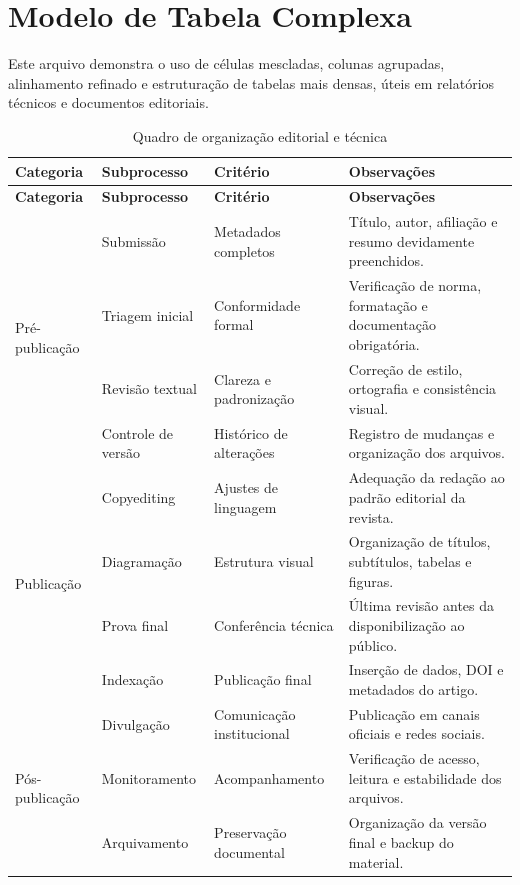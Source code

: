 \documentclass[11pt,a4paper]{article}
\begin{document}
\section*{Modelo de Tabela Complexa}

Este arquivo demonstra o uso de células mescladas, colunas agrupadas, alinhamento refinado e estruturação de tabelas mais densas, úteis em relatórios técnicos e documentos editoriais.

\begin{landscape}
\small
\begin{longtable}{p{3.0cm} p{3.8cm} p{3.4cm} p{4.6cm}}
\caption{Quadro de organização editorial e técnica} \label{tab:quadro}\\
\toprule
\textbf{Categoria} & \textbf{Subprocesso} & \textbf{Critério} & \textbf{Observações} \\
\midrule
\endfirsthead

\toprule
\textbf{Categoria} & \textbf{Subprocesso} & \textbf{Critério} & \textbf{Observações} \\
\midrule
\endhead

\multirow{4}{*}{Pré-publicação}
& Submissão & Metadados completos & Título, autor, afiliação e resumo devidamente preenchidos. \\
& Triagem inicial & Conformidade formal & Verificação de norma, formatação e documentação obrigatória. \\
& Revisão textual & Clareza e padronização & Correção de estilo, ortografia e consistência visual. \\
& Controle de versão & Histórico de alterações & Registro de mudanças e organização dos arquivos. \\

\midrule
\multirow{4}{*}{Publicação}
& Copyediting & Ajustes de linguagem & Adequação da redação ao padrão editorial da revista. \\
& Diagramação & Estrutura visual & Organização de títulos, subtítulos, tabelas e figuras. \\
& Prova final & Conferência técnica & Última revisão antes da disponibilização ao público. \\
& Indexação & Publicação final & Inserção de dados, DOI e metadados do artigo. \\

\midrule
\multirow{3}{*}{Pós-publicação}
& Divulgação & Comunicação institucional & Publicação em canais oficiais e redes sociais. \\
& Monitoramento & Acompanhamento & Verificação de acesso, leitura e estabilidade dos arquivos. \\
& Arquivamento & Preservação documental & Organização da versão final e backup do material. \\

\bottomrule
\end{longtable}
\end{landscape}
\end{document}
